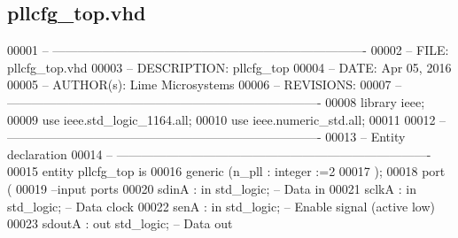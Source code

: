 \subsection{pllcfg\+\_\+top.\+vhd}
\label{pllcfg__top_8vhd_source}

\begin{DoxyCode}
00001 \textcolor{keyword}{-- ---------------------------------------------------------------------------- }
00002 \textcolor{keyword}{-- FILE:    pllcfg\_top.vhd}
00003 \textcolor{keyword}{-- DESCRIPTION: pllcfg\_top}
00004 \textcolor{keyword}{-- DATE:    Apr 05, 2016}
00005 \textcolor{keyword}{-- AUTHOR(s):   Lime Microsystems}
00006 \textcolor{keyword}{-- REVISIONS:}
00007 \textcolor{keyword}{-- ---------------------------------------------------------------------------- }
00008 \textcolor{vhdlkeyword}{library }\textcolor{keywordflow}{ieee};
00009 \textcolor{vhdlkeyword}{use }ieee.std\_logic\_1164.\textcolor{keywordflow}{all};
00010 \textcolor{vhdlkeyword}{use }ieee.numeric\_std.\textcolor{keywordflow}{all};
00011 
00012 \textcolor{keyword}{-- ----------------------------------------------------------------------------}
00013 \textcolor{keyword}{-- Entity declaration}
00014 \textcolor{keyword}{-- ----------------------------------------------------------------------------}
00015 \textcolor{keywordflow}{entity }pllcfg_top \textcolor{keywordflow}{is}
00016     \textcolor{keywordflow}{generic} \textcolor{vhdlchar}{(}\textcolor{vhdlchar}{n_pll}  \textcolor{vhdlchar}{:} \textcolor{comment}{integer} \textcolor{vhdlchar}{:=}\textcolor{vhdllogic}{}\textcolor{vhdllogic}{2}
00017     \textcolor{vhdlchar}{)};
00018   \textcolor{keywordflow}{port} \textcolor{vhdlchar}{(}
00019 \textcolor{keyword}{            --input ports }
00020         \textcolor{vhdlchar}{sdinA}           \textcolor{vhdlchar}{:} \textcolor{keywordflow}{in} \textcolor{comment}{std\_logic};\textcolor{keyword}{     -- Data in}
00021         \textcolor{vhdlchar}{sclkA}           \textcolor{vhdlchar}{:} \textcolor{keywordflow}{in} \textcolor{comment}{std\_logic};\textcolor{keyword}{     -- Data clock}
00022         \textcolor{vhdlchar}{senA}            \textcolor{vhdlchar}{:} \textcolor{keywordflow}{in} \textcolor{comment}{std\_logic};\textcolor{keyword}{ -- Enable signal (active low)}
00023         \textcolor{vhdlchar}{sdoutA}      \textcolor{vhdlchar}{:} \textcolor{keywordflow}{out} \textcolor{comment}{std\_logic};\textcolor{keyword}{    -- Data out}

\end{DoxyCode}
